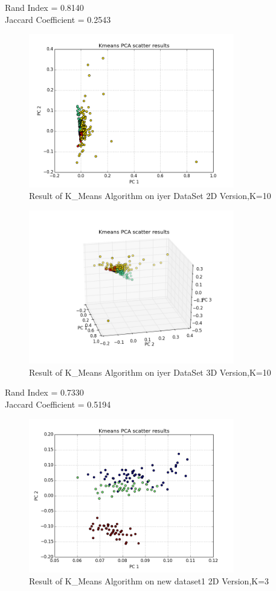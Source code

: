 \documentclass[paper=letter, fontsize=11pt]{article}
\numberwithin{equation}{section}		%
\numberwithin{figure}{section}			%
\numberwithin{table}{section}				%
\begin{document}
\noindent Rand Index = 0.8140\\
Jaccard Coefficient = 0.2543\\
\begin{figure}[H]
	\centering
	\includegraphics[width=0.8\textwidth]{K_iyer_2D}
	\caption{Result of K\_Means Algorithm on iyer DataSet 2D Version,K=10}
\end{figure}
\begin{figure}[H]
	\centering
	\includegraphics[width=0.8\textwidth]{K_iyer_3D}
	\caption{Result of K\_Means Algorithm on iyer DataSet 3D Version,K=10}
\end{figure}
\noindent Rand Index = 0.7330\\
Jaccard Coefficient = 0.5194\\
\begin{figure}[H]
	\centering
	\includegraphics[width=0.8\textwidth]{K_new_dataset_1_2D}
	\caption{Result of K\_Means Algorithm on new dataset1 2D Version,K=3}
\end{figure}
\end{document}
